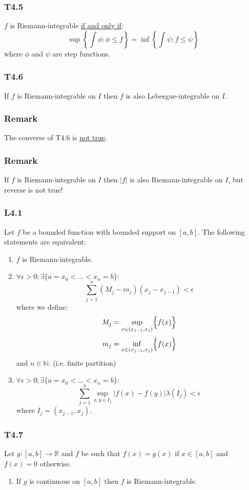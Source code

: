 \documentclass{article}
\begin{document}
\begin{multicols*}{3}
\subsubsection*{T4.5}
$f$ is Riemann-integrable \underline{if and only if}:
$$\sup\left\{\int\phi:\phi\leq f\right\}
=\inf\left\{\int\psi:f\leq\psi\right\}$$
where $\phi$ and $\psi$ are step functions.

\subsubsection*{T4.6}
If $f$ is Riemann-integrable on $I$ then
$f$ is also Lebesgue-integrable on $I$.

\subsubsection*{Remark}
The converse of T4.6 is \underline{not true}.

\subsubsection*{Remark}
If $f$ is Riemann-integrable on $I$
then $|f|$ is also Riemann-integrable on $I$,
but reverse is not true!

\subsubsection*{L4.1}
Let $f$ be a bounded function with
bounded support on $[a,b]$.
The following statements are equivalent:
\begin{enumerate}
    \item $f$ is Riemann-integrable.

    \item $\forall\epsilon>0;
    \exists\{a=x_0<\dots<x_n=b\}:$
    $$\sum_{j=1}^{n}(M_j-m_j)(x_j-x_{j-1})<\epsilon$$
    where we define:
    $$M_j=\sup_{x\in(x_{j-1},x_j)}\Bigl\{f(x)\Bigr\}$$
    $$m_j=\inf_{x\in(x_{j-1},x_j)}\Bigl\{f(x)\Bigr\}$$
    and $n\in\mathbb{N}$.
    (i.e. finite partition)

    \item $\forall\epsilon>0;
    \exists\{a=x_0<\dots<x_n=b\}:$
    $$\sum_{j=1}^{n}\sup_{x,y\in I_j}
    |f(x)-f(y)|\lambda(I_j)<\epsilon$$
    where $I_j=(x_{j-1},x_j)$.
\end{enumerate}

\subsubsection*{T4.7}
Let $g:[a,b]\rightarrow\mathbb{R}$
and $f$ be such that $f(x)=g(x)$ if $x\in[a,b]$
and $f(x)=0$ otherwise.
\begin{enumerate}
    \item If $g$ is continuous on $[a,b]$
    then $f$ is Riemann-integrable.


\end{enumerate}
\end{multicols*}
\end{document}
